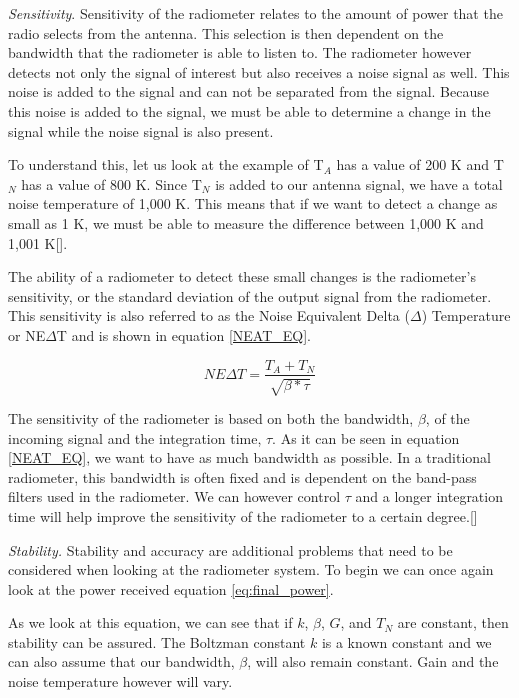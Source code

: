 \emph{Sensitivity}.  Sensitivity of the radiometer relates to the amount of power that the radio selects from the antenna.  This selection is then dependent on the bandwidth that the radiometer is able to listen to.  The radiometer however detects not only the signal of interest but also receives a noise signal as well.  This noise is added to the signal and can not be separated from the signal.  Because this noise is added to the signal, we must be able to determine a change in the signal while the noise signal is also present.  

To understand this, let us look at the example of T$_{A}$ has a value of 200 K and T$_{N}$ has a value of 800 K.  Since T$_{N}$ is added to our antenna signal, we have a total noise temperature of 1,000 K.  This means that if we want to detect a change as small as 1 K, we must be able to measure the difference between 1,000 K and 1,001 K[\cite{skou}].


The ability of a radiometer to detect these small changes is the radiometer's sensitivity, or the standard deviation of the output signal from the radiometer.  This sensitivity is also referred to as the Noise Equivalent Delta ($\Delta$) Temperature or NE$\Delta$T and is shown in equation \ref{NEAT_EQ}. 

\begin{equation} \label{NEAT_EQ}
NE\Delta T=\frac{T_{A}+T_{N}}{\sqrt{\beta * \tau}} 
\end{equation}

The sensitivity of the radiometer is based on both the bandwidth, $\beta$, of the incoming signal and the integration time, $\tau$.  As it can be seen in equation \ref{NEAT_EQ}, we want to have as much bandwidth as possible.  In a traditional radiometer, this bandwidth is often fixed and is dependent on the band-pass filters used in the radiometer.  We can however control $\tau$ and a longer integration time will help improve the sensitivity of the radiometer to a certain degree.[\cite{ulaby}]

\emph{Stability.}  Stability and accuracy are additional problems that need to be considered when looking at the radiometer system.  To begin we can once again look at the power received equation \ref{eq:final_power}.

As we look at this equation, we can see that if $k$, $\beta$, $G$, and $T_{N}$ are constant, then stability can be assured.  The Boltzman constant $k$ is a known constant and we can also assume that our bandwidth, $\beta$, will also remain constant.  Gain and the noise temperature however will vary.  


